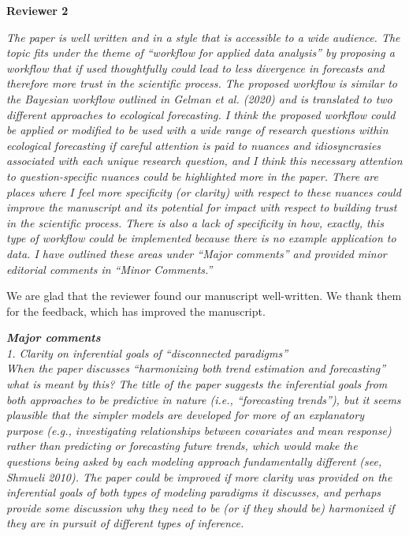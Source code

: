 \documentclass[11pt,letter]{article}
\begin{document}
{\bf Reviewer 2}

\begin{mybox}
\emph{The paper is well written and in a style that is accessible to a wide audience. The topic fits under the theme of “workflow for applied data analysis” by proposing a workflow that if used thoughtfully could lead to less divergence in forecasts and therefore more trust in the scientific process. The proposed workflow is similar to the Bayesian workflow outlined in Gelman et al. (2020) and is translated to two different approaches to ecological forecasting. I think the proposed workflow could be applied or modified to be used with a wide range of research questions within ecological forecasting if careful attention is paid to nuances and idiosyncrasies associated with each unique research question, and I think this necessary attention to question-specific nuances could be highlighted more in the paper. There are places where I feel more specificity (or clarity) with respect to these nuances could improve the manuscript and its potential for impact with respect to building trust in the scientific process. There is also a lack of specificity in how, exactly, this type of workflow could be implemented because there is no example application to data. I have outlined these areas under “Major comments” and provided minor editorial comments in “Minor Comments.”}
\end{mybox}


We are glad that the reviewer found our manuscript well-written. 
We thank them for the feedback, which has improved the manuscript.

\begin{mybox}
\emph{\textbf{Major comments}\\
1. Clarity on inferential goals of “disconnected paradigms”\\
 When the paper discusses “harmonizing both trend estimation and forecasting” what is meant by this? The title of the paper suggests the inferential goals from both approaches to be predictive in nature (i.e., “forecasting trends”), but it seems plausible that the simpler models are developed for more of an explanatory purpose (e.g., investigating relationships between covariates and mean response) rather than predicting or forecasting future trends, which would make the questions being asked by each modeling approach fundamentally different (see, Shmueli 2010). The paper could be improved if more clarity was provided on the inferential goals of both types of modeling paradigms it discusses, and perhaps provide some discussion why they need to be (or if they should be) harmonized if they are in pursuit of different types of inference.}
\end{mybox}
\end{document}
